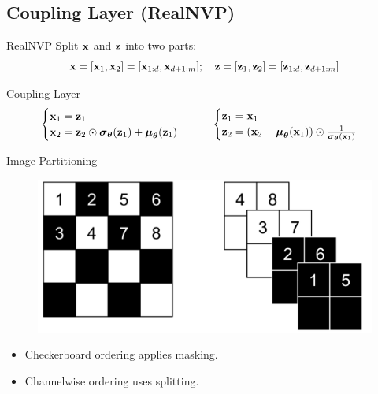\documentclass{beamer}
\begin{document}
\subsection{Coupling Layer (RealNVP)}
\begin{frame}{RealNVP}
	\vspace{-0.5cm}
	Split $\mathbf{x}$ and $\mathbf{z}$ into two parts: 
	\[
		\mathbf{x} = [\mathbf{x}_1, \mathbf{x}_2] = [\mathbf{x}_{1:d}, \mathbf{x}_{d+1:m}]; \quad \mathbf{z} = [\mathbf{z}_1, \mathbf{z}_2] = [\mathbf{z}_{1:d}, \mathbf{z}_{d+1:m}]
	\]
	\vspace{-0.7cm}
	\begin{block}{Coupling Layer}
		\vspace{-0.7cm}
		\[
			\begin{cases} \mathbf{x}_1 = \mathbf{z}_1 \\ \mathbf{x}_2 = \mathbf{z}_2 \odot \boldsymbol{\sigma}_{\boldsymbol{\theta}}(\mathbf{z}_1) + \boldsymbol{\mu}_{\boldsymbol{\theta}}(\mathbf{z}_1) \end{cases}
			\qquad
			\begin{cases} \mathbf{z}_1 = \mathbf{x}_1 \\ \mathbf{z}_2 = (\mathbf{x}_2 - \boldsymbol{\mu}_{\boldsymbol{\theta}}(\mathbf{x}_1)) \odot \frac{1}{\boldsymbol{\sigma}_{\boldsymbol{\theta}}(\mathbf{x}_1)} \end{cases}
		\]
	\end{block}
	\vspace{-0.5cm}
	\begin{block}{Image Partitioning}
		
		\begin{minipage}[t]{0.5\columnwidth}
			\begin{figure}
				\centering
				\includegraphics[width=\linewidth]{figs/realnvp_masking.png}
			\end{figure}
		\end{minipage}%
		\begin{minipage}[t]{0.5\columnwidth}
			\begin{itemize}
				\item Checkerboard ordering applies masking.
				\item Channelwise ordering uses splitting.
			\end{itemize}
		\end{minipage}
	\end{block}
	\vspace{-0.5cm}
\end{frame}
\end{document}
